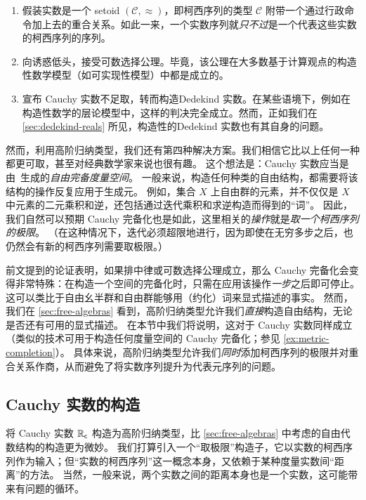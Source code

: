 \begin{enumerate}
\item 假装实数是一个 setoid $(\mathcal{C}, {\approx})$，即柯西序列的类型 $\mathcal{C}$ 附带一个通过行政命令加上去的重合关系。如此一来，一个实数序列就\emph{只不过}是一个代表这些实数的柯西序列的序列。
\item 向诱惑低头，接受可数选择公理。毕竟，该公理在大多数基于计算观点的构造性数学模型（如可实现性模型）中都是成立的。
\item 宣布 Cauchy 实数不足取，转而构造Dedekind 实数。在某些语境下，例如在构造性数学的层论模型中，这样的判决完全成立。然而，正如我们在 \cref{sec:dedekind-reals} 所见，构造性的Dedekind 实数也有其自身的问题。
\end{enumerate}

然而，利用高阶归纳类型，我们还有第四种解决方案。我们相信它比以上任何一种都更可取，甚至对经典数学家来说也很有趣。
这个想法是：Cauchy 实数应当是由~\Q 生成的\emph{自由完备度量空间}。
一般来说，构造任何种类的自由结构，都需要将该结构的操作反复应用于生成元。
例如，集合 $X$ 上自由群的元素，并不仅仅是 $X$ 中元素的二元乘积和逆，还包括通过迭代乘积和求逆构造而得到的``词''。
因此，我们自然可以预期 Cauchy 完备化也是如此，这里相关的\emph{操作}就是\emph{取一个柯西序列的极限}。
（在这种情况下，迭代必须超限地进行，因为即使在无穷多步之后，也仍然会有新的柯西序列需要取极限。）

前文提到的论证表明，如果排中律或可数选择公理成立，那么 Cauchy 完备化会变得非常特殊：在构造一个空间的完备化时，只需在应用该操作\emph{一步}之后即可停止。
这可以类比于自由幺半群和自由群能够用（约化）词来显式描述的事实。
然而，我们在 \cref{sec:free-algebras} 看到，高阶归纳类型允许我们\emph{直接}构造自由结构，无论是否还有可用的显式描述。
在本节中我们将说明，这对于 Cauchy 实数同样成立（类似的技术可用于构造任何度量空间的 Cauchy 完备化；参见 \cref{ex:metric-completion}）。
具体来说，高阶归纳类型允许我们\emph{同时}添加柯西序列的极限并对重合关系作商，从而避免了将实数序列提升为代表元序列的问题。
%

\subsection{Cauchy 实数的构造}
\label{sec:constr-cauchy-reals}

将 Cauchy 实数 $\mathbb{R}_\mathsf{c}$ 构造为高阶归纳类型，比 \cref{sec:free-algebras} 中考虑的自由代数结构的构造更为微妙。
我们打算引入一个``取极限''构造子，它以实数的柯西序列作为输入；但``实数的柯西序列''这一概念本身，又依赖于某种度量实数间``距离''的方法。
当然，一般来说，两个实数之间的距离本身也是一个实数，这可能带来有问题的循环。

